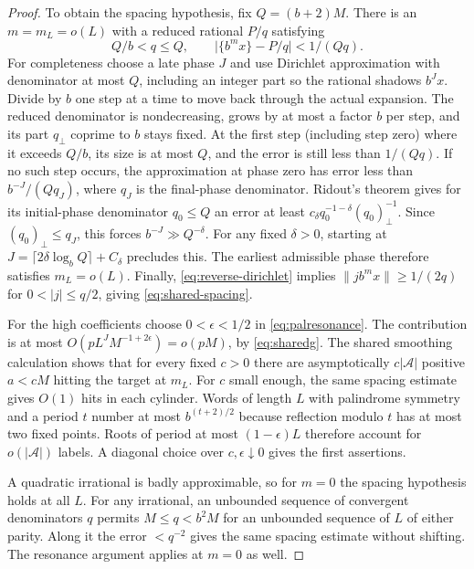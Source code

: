 \begin{proof}
To obtain the spacing hypothesis, fix $Q=(b+2)M$. There is an $m=m_L=o(L)$ with a reduced rational $P/q$ satisfying
\begin{equation}\label{eq:reverse-dirichlet}
 Q/b<q\le Q,\qquad
 \big|\{b^m x\}-P/q\big|<1/(Qq).
\end{equation}
For completeness choose a late phase $J$ and use Dirichlet approximation with denominator at most $Q$, including an integer part so the rational shadows $b^Jx$. Divide by $b$ one step at a time to move back through the actual expansion. The reduced denominator is nondecreasing, grows by at most a factor $b$ per step, and its part $q_\perp$ coprime to $b$ stays fixed. At the first step (including step zero) where it exceeds $Q/b$, its size is at most $Q$, and the error is still less than $1/(Qq)$. If no such step occurs, the approximation at phase zero has error less than $b^{-J}/(Qq_J)$, where $q_J$ is the final-phase denominator. Ridout's theorem \cite{Ridout} gives for its initial-phase denominator $q_0\le Q$ an error at least $c_\delta q_0^{-1-\delta}(q_0)_\perp^{-1}$. Since $(q_0)_\perp\le q_J$, this forces $b^{-J}\gg Q^{-\delta}$. For any fixed $\delta>0$, starting at $J=\lceil 2\delta\log_b Q\rceil+C_\delta$ precludes this. The earliest admissible phase therefore satisfies $m_L=o(L)$. Finally, \eqref{eq:reverse-dirichlet} implies $\|j b^m x\|\ge1/(2q)$ for $0<|j|\le q/2$, giving \eqref{eq:shared-spacing}.

For the high coefficients choose $0<\epsilon<1/2$ in \eqref{eq:palresonance}. The contribution is at most $O(p L^J M^{-1+2\epsilon})=o(pM)$, by \eqref{eq:sharedg}. The shared smoothing calculation shows that for every fixed $c>0$ there are asymptotically $c|\mathcal A|$ positive $a<cM$ hitting the target at $m_L$. For $c$ small enough, the same spacing estimate gives $O(1)$ hits in each cylinder. Words of length $L$ with palindrome symmetry and a period $t$ number at most $b^{(t+2)/2}$ because reflection modulo $t$ has at most two fixed points. Roots of period at most $(1-\epsilon)L$ therefore account for $o(|\mathcal A|)$ labels. A diagonal choice over $c,\epsilon\downarrow0$ gives the first assertions.

A quadratic irrational is badly approximable, so for $m=0$ the spacing hypothesis holds at all $L$. For any irrational, an unbounded sequence of convergent denominators $q$ permits $M\le q<b^2M$ for an unbounded sequence of $L$ of either parity. Along it the error $<q^{-2}$ gives the same spacing estimate without shifting. The resonance argument applies at $m=0$ as well.
\end{proof}


